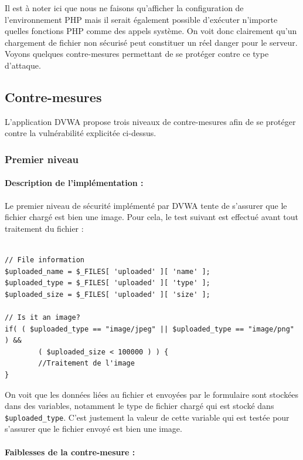 Il est à noter ici que nous ne faisons qu'afficher la configuration de l'environnement PHP mais il serait également possible d'exécuter n'importe quelles fonctions PHP comme des appels système. On voit donc clairement qu'un chargement de fichier non sécurisé peut constituer un réel danger pour le serveur. Voyons quelques contre-mesures permettant de se protéger contre ce type d'attaque.



\subsection{Contre-mesures}

L'application DVWA propose trois niveaux de contre-mesures afin de se protéger contre la vulnérabilité explicitée ci-dessus.

\subsubsection{Premier niveau}


\paragraph{Description de l'implémentation :}

Le premier niveau de sécurité implémenté par DVWA tente de s'assurer que le fichier chargé est bien une image. Pour cela, le test suivant est effectué avant tout traitement du fichier :

\begin{lstlisting}

// File information
$uploaded_name = $_FILES[ 'uploaded' ][ 'name' ];
$uploaded_type = $_FILES[ 'uploaded' ][ 'type' ];
$uploaded_size = $_FILES[ 'uploaded' ][ 'size' ];

// Is it an image? 
if( ( $uploaded_type == "image/jpeg" || $uploaded_type == "image/png" ) && 
        ( $uploaded_size < 100000 ) ) { 
        //Traitement de l'image
}
\end{lstlisting}

On voit que les données liées au fichier et envoyées par le formulaire sont stockées dans des variables, notamment le type de fichier chargé qui est stocké dans \texttt{\$uploaded\_type}. C'est justement la valeur de cette variable qui est testée pour s'assurer que le fichier envoyé est bien une image.

\paragraph{Faiblesses de la contre-mesure :}

